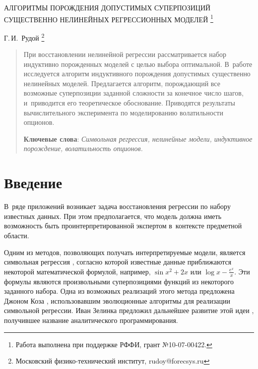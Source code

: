 \documentclass[12pt,a4paper]{article}
\begin{document}
\pagestyle{plain}
\lstset{language=C++}

\begin{center}
  АЛГОРИТМЫ ПОРОЖДЕНИЯ ДОПУСТИМЫХ СУПЕРПОЗИЦИЙ СУЩЕСТВЕННО НЕЛИНЕЙНЫХ РЕГРЕССИОННЫХ МОДЕЛЕЙ
	\footnote{Работа выполнена при поддержке РФФИ, грант №10-07-00422.}

  \bigskip
  Г.\,И.~Рудой \footnote{Московский физико-технический институт, rudoy@forecsys.ru}
\end{center}

\begin{abstract}
  При восстановлении нелинейной регрессии рассматривается набор
  индуктивно порожденных моделей с целью выбора оптимальной. В~работе
  исследуется алгоритм индуктивного порождения допустимых существенно
  нелинейных моделей. Предлагается алгоритм, порождающий все возможные
  суперпозиции заданной сложности за конечное число шагов, и~приводится его
  теоретическое обоснование. Приводятся результаты вычислительного эксперимента
  по моделированию волатильности опционов.

  \bigskip
  \textbf{Ключевые слова}: \emph{Символьная регрессия, нелинейные модели, индуктивное порождение,
	волатильность опционов.}
\end{abstract}

\section{Введение}

В~ряде приложений \cite{duffy:1999:srised,Barmpalexis201175,Schmidt:2009:GPTP}
возникает задача восстановления регрессии по набору известных данных.
При этом предполагается, что модель должна иметь возможность быть
проинтерпретированной экспертом в~контексте предметной области.

Одним из методов, позволяющих получать интерпретируемые модели, является
символьная регрессия \cite{davidson:2000:snrea, reference/ml/X10vc, StrijovW10},
согласно которой известные данные приближаются некоторой математической
формулой, например, $ \sin x^2 + 2x $ или $\log x - \frac{e^x}{x} $.
Эти формулы являются произвольными суперпозициями функций из некоторого
заданного набора. Одна из возможных реализаций этого метода
предложена Джоном Коза \cite{Koza1998GP, Koza1998Intro}, использовавшим
эволюционные алгоритмы для реализации символьной регрессии. Иван Зелинка
предложил дальнейшее развитие этой идеи \cite{Zelinka2008}, получившее
название аналитического программирования.
\end{document}
